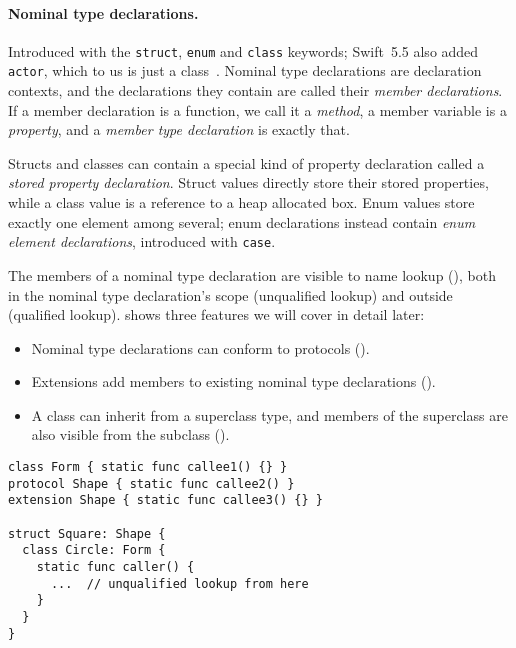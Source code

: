 \documentclass[../generics]{subfiles}
\begin{document}
\paragraph{Nominal type declarations.}
Introduced with the \texttt{struct}, \texttt{enum} and \texttt{class} keywords; Swift~5.5 also added \texttt{actor}, which to us is just a class~\cite{se0306}. Nominal type declarations are declaration contexts, and the declarations they contain are called their \emph{member declarations}. If a member declaration is a function, we call it a \emph{method}, a member variable is a \emph{property}, and a \emph{member type declaration} is exactly that.

Structs and classes can contain a special kind of property declaration called a \emph{stored property declaration}. Struct values directly store their stored properties, while a class value is a reference to a heap allocated box. Enum values store exactly one element among several; enum declarations instead contain \emph{enum element declarations}, introduced with \texttt{case}.

The members of a nominal type declaration are visible to name lookup (), both in the nominal type declaration's scope (unqualified lookup) and outside (qualified lookup).  shows three features we will cover in detail later:
\begin{itemize}
\item Nominal type declarations can conform to protocols ().
\item Extensions add members to existing nominal type declarations ().
\item A class can inherit from a superclass type, and members of the superclass are also visible from the subclass ().
\end{itemize}

\begin{listing}\label{unqualified lookup listing}
\begin{Verbatim}
class Form { static func callee1() {} }
protocol Shape { static func callee2() }
extension Shape { static func callee3() {} }

struct Square: Shape {
  class Circle: Form {
    static func caller() {
      ...  // unqualified lookup from here
    }
  }
}
\end{Verbatim}
\end{listing}
\end{document}
